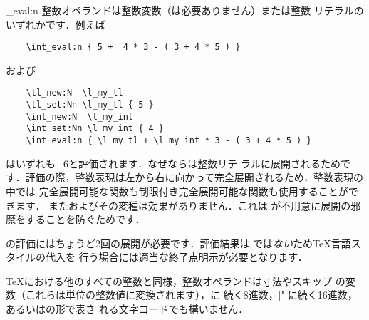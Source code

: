 \documentclass[uplatex,dvipdfmx,full,kernel]{wtpl3doc}
\begin{document}
\begin{documentation}
\begin{function}[EXP]{\int_eval:n}
  整数オペランドは整数変数（は必要ありません）または整数
  リテラルのいずれかです．例えば
%
  \begin{verbatim}
    \int_eval:n { 5 +  4 * 3 - ( 3 + 4 * 5 ) }
  \end{verbatim}
%
  および
%
  \begin{verbatim}
    \tl_new:N  \l_my_tl
    \tl_set:Nn \l_my_tl { 5 }
    \int_new:N  \l_my_int
    \int_set:Nn \l_my_int { 4 }
    \int_eval:n { \l_my_tl + \l_my_int * 3 - ( 3 + 4 * 5 ) }
  \end{verbatim}
%
  はいずれも$-6$と評価されます．なぜならは整数リテ
  ラルに展開されるためです．評価の際，整数表現は左から右に向かって完全展開されるため，整数表現の中では
  完全展開可能な関数も制限付き完全展開可能な関数も使用することができます．
  またおよびその変種は効果がありません．これは%
  が不用意に展開の邪魔をすることを防ぐためです．
%
  \begin{texnote}
    の評価にはちょうど2回の展開が必要です．評価結果は
    では\emph{ない}ため\TeX 言語スタイルの代入を
    行う場合には適当な終了点明示が必要となります．

    \TeX における他のすべての整数と同様，整数オペランドは寸法やスキップ
    の変数（これらは単位の整数値に変換されます），に
    続く8進数，|"|に続く16進数，あるいはの形で表さ
    れる文字コードでも構いません．
  \end{texnote}
\end{function}


\end{documentation}
\end{document}
